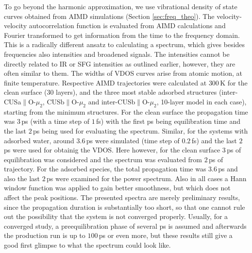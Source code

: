 \documentclass[11pt,DIV=13,BCOR=5mm,a4paper,headinclude]{scrbook}
\begin{document}
To go beyond the harmonic approximation, we use vibrational density of state curves obtained from AIMD simulations (Section \ref{sec:freq_theo}).
The velocity-velocity autocorrelation function is evaluated from AIMD calculations and Fourier transformed to get information from the time to the frequency domain.
This is a radically different ansatz to calculating a spectrum, which gives besides frequencies also intensities and broadened signals.
The intensities cannot be directly related to IR or SFG intensities as outlined earlier, however, they are often similar to them\cite{Melani2018}.
The widths of VDOS curves arise from atomic motion, at finite temperature.
Respective AIMD trajectories were calculated at $300\,$K for the clean surface (30 layers), and the three most stable adsorbed structures (inter-CUSa$\parallel$O-$\mu_2$, CUSb$\parallel$O-$\mu_2$ and inter-CUSb$\parallel$O-$\mu_2$, 10-layer model in each case), starting from the minimum structures.
For the clean surface the propagation time was $3\,$ps (with a time step of $1\,$fs) with the first ps being equilibration time and the last $2\,$ps being used for evaluating the spectrum.
Similar, for the systems with adsorbed water, around $3.6\,$ps were simulated (time step of $0.2\,$fs) and the last $2\,$ps were used for obtainig the VDOS.
Here however, for the clean surface $3\,$ps of equilibration was considered and the spectrum was evaluated from $2\,$ps of trajectory.
For the adsorbed species, the total propagation time was $3.6\,$ps and also the last $2\,$ps were examined for the power spectrum.
Also in all cases a Hann window function was applied\cite{Ohto2015} to gain better smoothness, but which does not affect the peak positions.
The presented spectra are merely preliminary results, since the propagation duration is substantially too short, so that one cannot rule out the possibility that the system is not converged properly.
Usually, for a converged study, a preequilibration phase of several ps is assumed and afterwards the production run is up to $100\,$ps or even more, but these results still give a good first glimpse to what the spectrum could look like.
\end{document}
